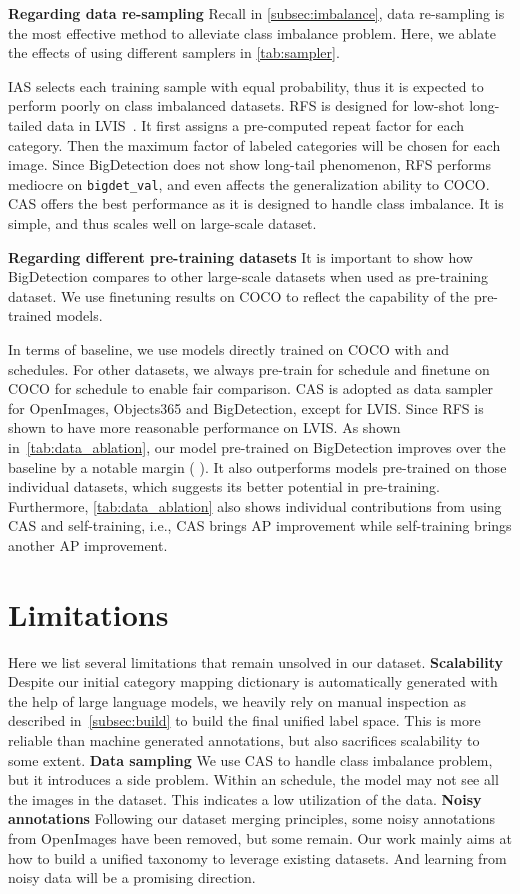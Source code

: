 \documentclass[10pt,twocolumn,letterpaper]{article}
\begin{document}
\noindent \textbf{Regarding data re-sampling}
Recall in \cref{subsec:imbalance}, data re-sampling is the most effective method to alleviate class imbalance problem. 
Here, we ablate the effects of using different samplers in \cref{tab:sampler}. 

IAS selects each training sample with equal probability, thus it is expected to perform poorly on class imbalanced datasets. 
RFS is designed for low-shot long-tailed data in LVIS~\cite{gupta2019lvis}. It first assigns a pre-computed repeat factor for each category. Then the maximum factor of labeled categories will be chosen for each image. 
Since BigDetection does not show long-tail phenomenon, RFS performs mediocre on \verb+bigdet_val+, and even affects the generalization ability to COCO.
CAS offers the best performance as it is designed to handle class imbalance. It is simple, and thus scales well on large-scale dataset. 

\noindent \textbf{Regarding different pre-training datasets}
It is important to show how BigDetection compares to other large-scale datasets when used as pre-training dataset. 
We use finetuning results on COCO to reflect the capability of the pre-trained models.

In terms of baseline, we use models directly trained on COCO with  and  schedules.
For other datasets, we always pre-train for  schedule and finetune on COCO for  schedule to enable fair comparison. CAS is adopted as data sampler for OpenImages, Objects365 and BigDetection, except for LVIS. Since RFS is shown to have more reasonable performance on LVIS. 
As shown in~\cref{tab:data_ablation}, our model pre-trained on BigDetection improves over the baseline by a notable margin (  ). It also outperforms models pre-trained on those individual datasets, which suggests its better potential in pre-training. Furthermore, \cref{tab:data_ablation} also shows individual contributions from using CAS and self-training, i.e., CAS brings  AP improvement  while self-training brings another  AP improvement.

 
\section{Limitations}
\label{sec:limitations}

Here we list several limitations that remain unsolved in our dataset.
\textbf{Scalability}
Despite our initial category mapping dictionary is automatically generated with the help of large language models, we heavily rely on manual inspection as described in~\cref{subsec:build} to build the final unified label space.
This is more reliable than machine generated annotations, but also sacrifices scalability to some extent. 
\textbf{Data sampling}
We use CAS to handle class imbalance problem, but it introduces a side problem. Within an  schedule, the model may not see all the images in the dataset.
This indicates a low utilization of the data.
\textbf{Noisy annotations}
Following our dataset merging principles, some noisy annotations from OpenImages have been removed, but some remain. 
Our work mainly aims at how to build a unified taxonomy to leverage existing datasets. 
And learning from noisy data will be a promising direction.
\end{document}
